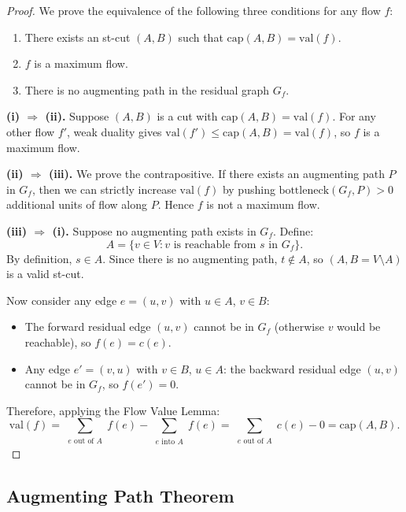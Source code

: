 \documentclass[12pt,a4paper]{report}
\begin{document}
\begin{proof}
We prove the equivalence of the following three conditions for any
flow $f$:
\begin{enumerate}[label=(\roman*)]
    \item There exists an st-cut $(A,B)$ such that
          $\mathrm{cap}(A,B) = \mathrm{val}(f)$.
    \item $f$ is a maximum flow.
    \item There is no augmenting path in the residual graph $G_f$.
\end{enumerate}

\medskip
\noindent\textbf{(i) $\Rightarrow$ (ii).}
Suppose $(A,B)$ is a cut with $\mathrm{cap}(A,B) = \mathrm{val}(f)$.
For any other flow $f'$, weak duality gives
$\mathrm{val}(f') \leq \mathrm{cap}(A,B) = \mathrm{val}(f)$,
so $f$ is a maximum flow.

\medskip
\noindent\textbf{(ii) $\Rightarrow$ (iii).}
We prove the contrapositive.
If there exists an augmenting path $P$ in $G_f$, then we can
strictly increase $\mathrm{val}(f)$ by pushing
$\mathrm{bottleneck}(G_f, P) > 0$ additional units of flow along $P$.
Hence $f$ is not a maximum flow.

\medskip
\noindent\textbf{(iii) $\Rightarrow$ (i).}
Suppose no augmenting path exists in $G_f$. Define:
\[
    A = \{ v \in V : v \text{ is reachable from } s \text{ in } G_f \}.
\]
By definition, $s \in A$. Since there is no augmenting path, $t \notin A$,
so $(A, B = V \setminus A)$ is a valid st-cut.

Now consider any edge $e = (u,v)$ with $u \in A$, $v \in B$:
\begin{itemize}
    \item The forward residual edge $(u,v)$ cannot be in $G_f$
          (otherwise $v$ would be reachable), so $f(e) = c(e)$.
    \item Any edge $e' = (v,u)$ with $v \in B$, $u \in A$: the backward
          residual edge $(u,v)$ cannot be in $G_f$, so $f(e') = 0$.
\end{itemize}
Therefore, applying the Flow Value Lemma:
\[
    \mathrm{val}(f)
    = \sum_{\substack{e \text{ out of } A}} f(e)
    - \sum_{\substack{e \text{ into } A}} f(e)
    = \sum_{\substack{e \text{ out of } A}} c(e) - 0
    = \mathrm{cap}(A, B).
\]
\end{proof}

\subsection{Augmenting Path Theorem}
\end{document}
